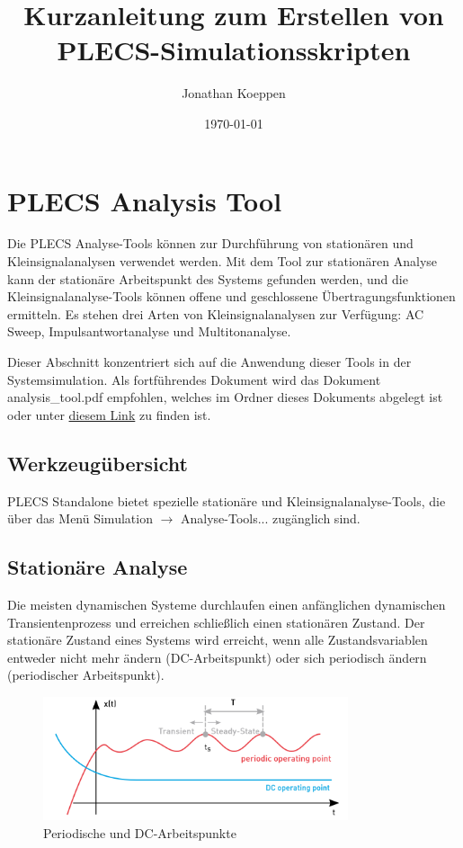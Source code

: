 \documentclass[a4paper,11pt,oneside]{article}
\title{Kurzanleitung zum Erstellen von PLECS-Simulationsskripten}
\author{Jonathan Koeppen}
\date{\today}
\begin{document}
	\maketitle
	\newpage
	\pagestyle{fancy}
	\tableofcontents
	\setcounter{section}{1}
	\section*{PLECS Analysis Tool}
Die PLECS Analyse-Tools können zur Durchführung von stationären und Kleinsignalanalysen verwendet werden. Mit dem Tool zur stationären Analyse kann der stationäre Arbeitspunkt des Systems gefunden werden, und die Kleinsignalanalyse-Tools können offene und geschlossene Übertragungsfunktionen ermitteln. Es stehen drei Arten von Kleinsignalanalysen zur Verfügung: AC Sweep, Impulsantwortanalyse und Multitonanalyse.

Dieser Abschnitt konzentriert sich auf die Anwendung dieser Tools in der Systemsimulation.
Als fortführendes Dokument wird das Dokument analysis\_tool.pdf empfohlen, welches im Ordner dieses Dokuments abgelegt ist oder unter \href{https://www.plexim.com/sites/default/files/tutorials_categorized/plecs/analysis_tools.pdf}{diesem Link} zu finden ist.

\subsection{Werkzeugübersicht}
PLECS Standalone bietet spezielle stationäre und Kleinsignalanalyse-Tools, die über das Menü Simulation $\rightarrow$ Analyse-Tools... zugänglich sind.
\subsection{Stationäre Analyse}
Die meisten dynamischen Systeme durchlaufen einen anfänglichen dynamischen Transientenprozess und erreichen schließlich einen stationären Zustand. Der stationäre Zustand eines Systems wird erreicht, wenn alle Zustandsvariablen entweder nicht mehr ändern (DC-Arbeitspunkt) oder sich periodisch ändern (periodischer Arbeitspunkt).

\begin{figure}[h]
	\centering
	\includegraphics[width=0.8\textwidth]{steady_state.png}
	\caption{Periodische und DC-Arbeitspunkte}
\end{figure}
\end{document}
